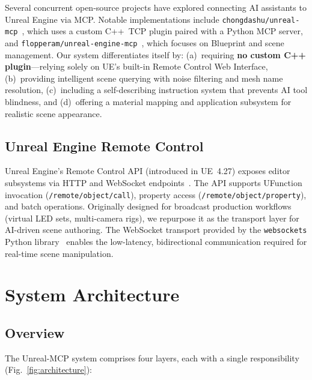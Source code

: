 \documentclass[conference]{IEEEtran}
\begin{document}
Several concurrent open-source projects have explored connecting AI assistants to Unreal Engine via MCP. Notable implementations include \texttt{chongdashu/unreal-mcp}~\cite{chongdashu2024}, which uses a custom C++~TCP plugin paired with a Python MCP server, and \texttt{flopperam/unreal-engine-mcp}~\cite{flopperam2025}, which focuses on Blueprint and scene management. Our system differentiates itself by: (a)~requiring \textbf{no custom C++ plugin}---relying solely on UE's built-in Remote Control Web Interface, (b)~providing intelligent scene querying with noise filtering and mesh name resolution, (c)~including a self-describing instruction system that prevents AI tool blindness, and (d)~offering a material mapping and application subsystem for realistic scene appearance.

\subsection{Unreal Engine Remote Control}

Unreal Engine's Remote Control API (introduced in UE~4.27) exposes editor subsystems via HTTP and WebSocket endpoints~\cite{epic2024remotecontrol}. The API supports UFunction invocation (\texttt{/remote/object/call}), property access (\texttt{/remote/object/property}), and batch operations. Originally designed for broadcast production workflows (virtual LED sets, multi-camera rigs), we repurpose it as the transport layer for AI-driven scene authoring. The WebSocket transport provided by the \texttt{websockets} Python library~\cite{augustin2024websockets} enables the low-latency, bidirectional communication required for real-time scene manipulation.

\section{System Architecture}

\subsection{Overview}

The Unreal-MCP system comprises four layers, each with a single responsibility (Fig.~\ref{fig:architecture}):
\end{document}
